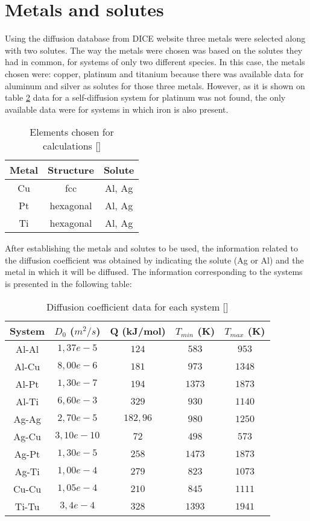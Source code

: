 \section{Metals and solutes}

Using the diffusion database from DICE website three metals were selected along with two solutes. The way the metals were chosen was based on the solutes they had in common, for systems of only two different species. In this case, the metals chosen were: copper, platinum and titanium because there was available data for aluminum and silver as solutes for those three metals. However, as it is shown on table \ref{tab:tabla2} data for a self-diffusion system for platinum was not found, the only available data were for systems in which iron is also present. 

\begin{table}[h]
    \centering
    \begin{tabular}{ccc}
        Metal & Structure & Solute\\ \hline \hline
        Cu & fcc & Al, Ag \\
        Pt & hexagonal & Al, Ag \\
        Ti & hexagonal & Al, Ag \\
    \end{tabular}
    \caption{Elements chosen for calculations []}
    \label{tab:tabla1}
\end{table}

After establishing the metals and solutes to be used, the information related to the diffusion coefficient was obtained by indicating the solute (Ag or Al) and the metal in which it will be diffused. The information corresponding to the systems is presented in the following table:

\begin{table}[h]
    \centering
    \begin{tabular}{ccccc}
        System & $D_0$ ($m^2/s$) & Q (kJ/mol) & $T_{min}$ (K) & $T_{max}$ (K) \\ \hline \hline
        Al-Al & $1,37e-5$ & $124$ & $583$ & $953$ \\
        Al-Cu & $8,00e-6$ & $181$ & $973$ & $1348$ \\
        Al-Pt & $1,30e-7$ & $194$ & $1373$ & $1873$\\
        Al-Ti & $6,60e-3$ & $329$ & $930$ & $1140$\\
        Ag-Ag & $2,70e-5$ & $182,96$ & $980$ & $1250$\\
        Ag-Cu & $3,10e-10$ & $72$ & $498$ & $573$\\
        Ag-Pt & $1,30e-5$ & $258$ & $1473$ & $1873$\\
        Ag-Ti & $1,00e-4$ & $279$ & $823$ & $1073$\\
        Cu-Cu & $1,05e-4$ & $210$ & $845$ & $1111$\\
        Ti-Tu & $3,4e-4$ & $328$ & $1393$ & $1941$
    \end{tabular}
    \caption{Diffusion coefficient data for each system [\cite{kakusan}]}
    \label{tab:tabla2}
\end{table}